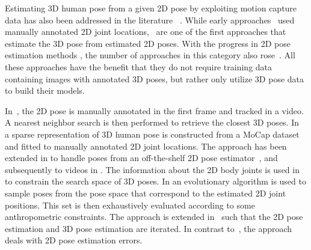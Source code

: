 \documentclass[10pt,journal,compsoc]{IEEEtran}
\begin{document}
Estimating 3D human pose from a given 2D pose by exploiting motion capture data has also been addressed in the literature
~\cite{SimoSerraCVPR2012,Ramakrishna_2012,yasin-2013,SimoSerraCVPR2013,Wang_2014_CVPR, zhou2015sparse, bogo2016keep, sanzari2016bayesian, chen2017matching, lassner2017unite, tome2017lifting}. 
While early approaches~\cite{Ramakrishna_2012, SimoSerraCVPR2012, yasin-2013} used 
manually annotated 2D joint locations,~\cite{SimoSerraCVPR2013, Wang_2014_CVPR} are one of the first approaches that estimate the 3D pose from estimated 2D poses. 
With the progress in 2D pose estimation methods 
\cite{toshev2014deeppose, pishchulin2016deepcut, carreira2015human, iqbalFG2017actionpose, wei2016convolutional, hu2016bottom, 
insafutdinov2016deepercut, newell2016eccv, bulat2016human, georgia2016eccv, rafi2016bmvc, chu2017CVPRmulti}, the number of approaches in this category 
also rose~\cite{zhou2015sparse, bogo2016keep, chen2017matching, lassner2017unite, tome2017lifting}. All these approaches have the 
benefit that they do not require training data containing images with annotated 3D poses, but rather only utilize 3D pose data to build their models.

In~\cite{yasin-2013}, the 2D pose is manually annotated in the first frame and tracked in a video. A nearest neighbor search is then
performed to retrieve the closest 3D poses. In~\cite{Ramakrishna_2012} a sparse representation of 3D human pose is constructed from a MoCap dataset and
fitted to manually annotated 2D joint locations. The approach has been extended in \cite{Wang_2014_CVPR} to
handle poses from an off-the-shelf 2D pose estimator~\cite{YiYang-2011}, and subsequently to videos in \cite{du2016marker}.
The information about the 2D body joints is used in \cite{SimoSerraCVPR2012,SimoSerraCVPR2013} to constrain the search space of 3D poses. In \cite{SimoSerraCVPR2012}
an evolutionary algorithm is used to sample poses from the pose space that correspond to the estimated 2D joint positions.
This set is then exhaustively evaluated according to some anthropometric constraints. The approach is extended
in~\cite{SimoSerraCVPR2013} such that the 2D pose estimation and 3D pose estimation are iterated. In contrast
to~\cite{Ramakrishna_2012,Wang_2014_CVPR,SimoSerraCVPR2012}, the approach \cite{SimoSerraCVPR2013} deals with 2D pose 
estimation errors. 
\end{document}
